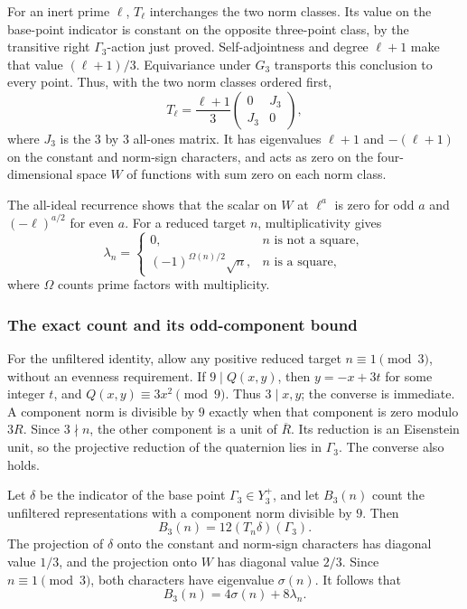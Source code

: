 For an inert prime $\ell$, $T_\ell$ interchanges the two norm classes.
Its value on the base-point indicator is constant on the opposite
three-point class, by the transitive right $\Gamma_3$-action just proved.
Self-adjointness and degree $\ell+1$ make that value $(\ell+1)/3$.
Equivariance under $G_3$ transports this conclusion to every point. Thus,
with the two norm classes ordered first,
\[
T_\ell=\frac{\ell+1}{3}
\begin{pmatrix}0&J_3\\J_3&0\end{pmatrix},
\]
where $J_3$ is the $3$ by $3$ all-ones matrix.
It has eigenvalues $\ell+1$ and $-(\ell+1)$ on the constant and norm-sign
characters, and acts as zero on the four-dimensional space $W$ of
functions with sum zero on each norm class.

The all-ideal recurrence shows that the scalar on $W$ at $\ell^a$ is
zero for odd $a$ and $(-\ell)^{a/2}$ for even $a$. For a reduced target
$n$, multiplicativity gives
\[
\lambda_n=
\begin{cases}
0,&n\text{ is not a square},\\
(-1)^{\Omega(n)/2}\sqrt n,&n\text{ is a square},
\end{cases}
\]
where $\Omega$ counts prime factors with multiplicity.

\subsubsection{The exact count and its odd-component bound}
For the unfiltered identity, allow any positive reduced target
$n\equiv1\pmod3$, without an evenness requirement. If
$9\mid Q(x,y)$, then $y=-x+3t$ for some integer $t$, and
$Q(x,y)\equiv3x^2\pmod9$. Thus $3\mid x,y$; the converse is immediate.
A component norm is divisible by $9$ exactly when that component is zero
modulo $3R$. Since $3\nmid n$, the other component is a unit of
$\overline R$. Its reduction is an Eisenstein unit, so the projective
reduction of the quaternion lies in $\Gamma_3$. The converse also holds.

Let $\delta$ be the indicator of the base point $\Gamma_3\in Y_3^+$,
and let $B_3(n)$ count the unfiltered representations with a component
norm divisible by $9$. Then
\[
B_3(n)=12(T_n\delta)(\Gamma_3).
\]
The projection of $\delta$ onto the constant and norm-sign characters
has diagonal value $1/3$, and the projection onto $W$ has diagonal
value $2/3$. Since $n\equiv1\pmod3$, both characters have eigenvalue
$\sigma(n)$. It follows that
\begin{equation}\label{eq:ramified-exact}
B_3(n)=4\sigma(n)+8\lambda_n.
\end{equation}

